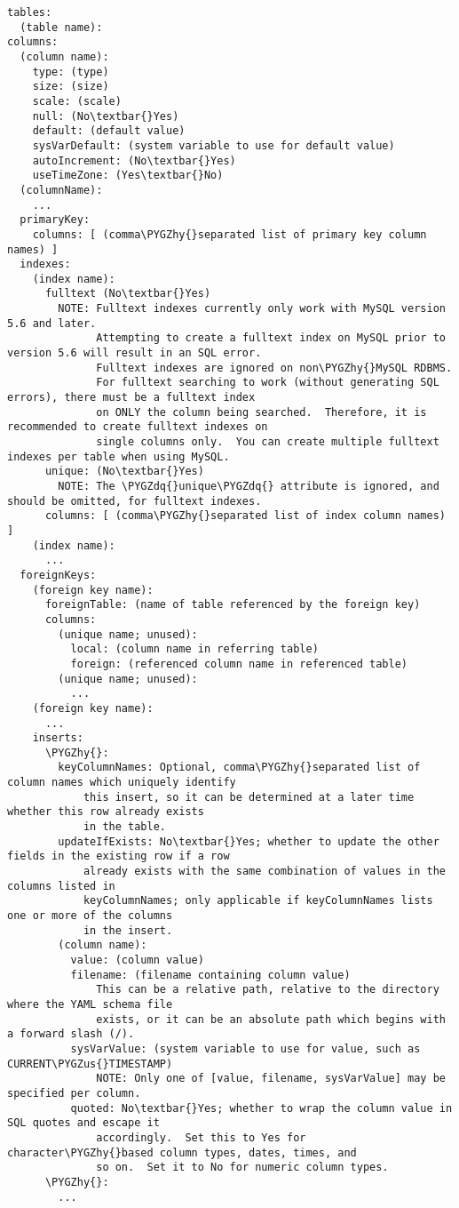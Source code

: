 \documentclass[letterpaper,10pt,english]{sphinxmanual}
\def\PYGZus{\char`\_}
\def\PYGZhy{\char`\-}
\def\PYGZdq{\char`\"}
\begin{document}
\begin{Verbatim}[commandchars=\\\{\}]
tables:
  (table name):
columns:
  (column name):
    type: (type)
    size: (size)
    scale: (scale)
    null: (No\textbar{}Yes)
    default: (default value)
    sysVarDefault: (system variable to use for default value)
    autoIncrement: (No\textbar{}Yes)
    useTimeZone: (Yes\textbar{}No)
  (columnName):
    ...
  primaryKey:
    columns: [ (comma\PYGZhy{}separated list of primary key column names) ]
  indexes:
    (index name):
      fulltext (No\textbar{}Yes)
        NOTE: Fulltext indexes currently only work with MySQL version 5.6 and later.
              Attempting to create a fulltext index on MySQL prior to version 5.6 will result in an SQL error.
              Fulltext indexes are ignored on non\PYGZhy{}MySQL RDBMS.
              For fulltext searching to work (without generating SQL errors), there must be a fulltext index
              on ONLY the column being searched.  Therefore, it is recommended to create fulltext indexes on
              single columns only.  You can create multiple fulltext indexes per table when using MySQL.
      unique: (No\textbar{}Yes)
        NOTE: The \PYGZdq{}unique\PYGZdq{} attribute is ignored, and should be omitted, for fulltext indexes.
      columns: [ (comma\PYGZhy{}separated list of index column names) ]
    (index name):
      ...
  foreignKeys:
    (foreign key name):
      foreignTable: (name of table referenced by the foreign key)
      columns:
        (unique name; unused):
          local: (column name in referring table)
          foreign: (referenced column name in referenced table)
        (unique name; unused):
          ...
    (foreign key name):
      ...
    inserts:
      \PYGZhy{}:
        keyColumnNames: Optional, comma\PYGZhy{}separated list of column names which uniquely identify
            this insert, so it can be determined at a later time whether this row already exists
            in the table.
        updateIfExists: No\textbar{}Yes; whether to update the other fields in the existing row if a row
            already exists with the same combination of values in the columns listed in
            keyColumnNames; only applicable if keyColumnNames lists one or more of the columns
            in the insert.
        (column name):
          value: (column value)
          filename: (filename containing column value)
              This can be a relative path, relative to the directory where the YAML schema file
              exists, or it can be an absolute path which begins with a forward slash (/).
          sysVarValue: (system variable to use for value, such as CURRENT\PYGZus{}TIMESTAMP)
              NOTE: Only one of [value, filename, sysVarValue] may be specified per column.
          quoted: No\textbar{}Yes; whether to wrap the column value in SQL quotes and escape it
              accordingly.  Set this to Yes for character\PYGZhy{}based column types, dates, times, and
              so on.  Set it to No for numeric column types.
      \PYGZhy{}:
        ...
\end{Verbatim}
\end{document}
